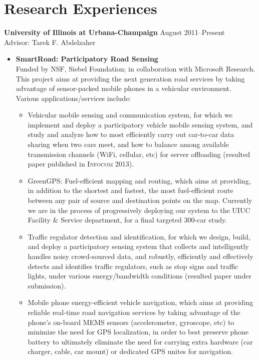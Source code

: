 \section{\sc Research Experiences}
{\bf University of Illinois at Urbana-Champaign} \hfill August 2011--Present\\
Advisor: Tarek F. Abdelzaher
\begin{itemize}
\item \textbf{SmartRoad: Participatory Road Sensing} \\ Funded by NSF,
  Siebel Foundation; in collaboration with Microsoft Research. This
  project aims at providing the next generation road services by
  taking advantage of sensor-packed mobile phones in a vehicular
  environment. Various applications/services include:
\begin{itemize}
\item Vehicular mobile sensing and communication system, for which we
  implement and deploy a participatory vehicle mobile sensing system,
  and study and analyze how to most efficiently carry out car-to-car
  data sharing when two cars meet, and how to balance among available
  transmission channels (WiFi, cellular, etc) for server offloading
  (resulted paper published in \textsc{Infocom 2013}).

\item GreenGPS: Fuel-efficient mapping and routing, which aims at
  providing, in addition to the shortest and fastest, the most
  fuel-efficient route between any pair of source and destination
  points on the map. Currently we are in the process of progressively
  deploying our system to the UIUC Facility \& Service department, for
  a final targeted 300-car study.

\item Traffic regulator detection and identification, for which we
  design, build, and deploy a participatory sensing system that
  collects and intelligently handles noisy crowd-sourced data, and
  robustly, efficiently and effectively detects and identifies traffic
  regulators, such as stop signs and traffic lights, under various
  energy/bandwidth conditions (resulted paper under submission).

\item Mobile phone energy-efficient vehicle navigation, which aims at
  providing reliable real-time road navigation services by taking
  advantage of the phone's on-board MEMS sensors (accelerometer,
  gyroscope, etc) to minimize the need for GPS localization, in order
  to best preserve phone battery to ultimately eliminate the need for
  carrying extra hardware (car charger, cable, car mount) or dedicated
  GPS unites for navigation.
\end{itemize}


\end{itemize}
